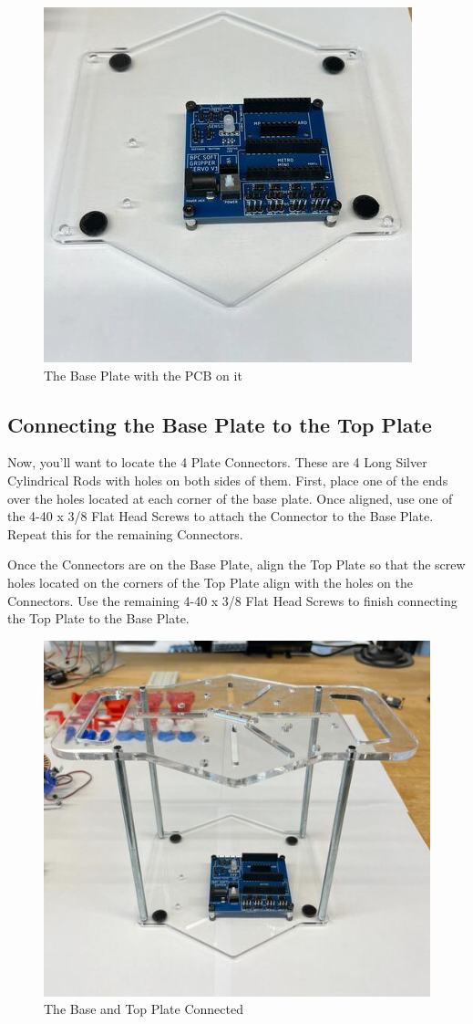 \documentclass{article}
\begin{document}
\begin{figure}[H]
    \centering
    \includegraphics[width=0.5\linewidth]{PCBImages/Frame/frame_2.png}
    \caption{The Base Plate with the PCB on it}
    \label{fig:base_with_pcb}
\end{figure}

\subsection{Connecting the Base Plate to the Top Plate}
Now, you'll want to locate the 4 Plate Connectors. These are 4 Long Silver Cylindrical Rods with holes on both sides of them. First, place one of the ends over the holes located at each corner of the base plate. Once aligned, use one of the 4-40 x 3/8 Flat Head Screws to attach the Connector to the Base Plate. Repeat this for the remaining Connectors.

Once the Connectors are on the Base Plate, align the Top Plate so that the screw holes located on the corners of the Top Plate align with the holes on the Connectors. Use the remaining 4-40 x 3/8 Flat Head Screws to finish connecting the Top Plate to the Base Plate.

\begin{figure}[H]
    \centering
    \includegraphics[width=0.5\linewidth]{PCBImages/Frame/frame_3.png}
    \caption{The Base and Top Plate Connected}
    \label{fig:base_top_connected}
\end{figure}
\end{document}
